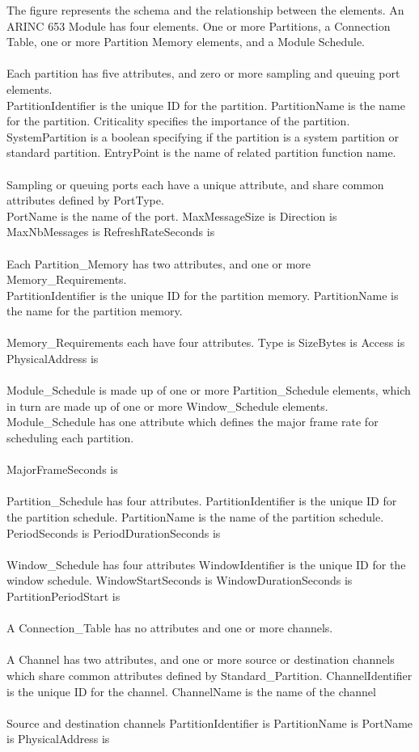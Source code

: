 The figure represents the schema and the 
relationship between the elements. 
An ARINC 653 Module has four elements.
One or more Partitions, a Connection Table, 
one or more Partition Memory elements, and 
a Module Schedule.
\\\\
Each partition has five attributes, and zero 
or more sampling and queuing port elements. 
\\
PartitionIdentifier is the unique ID for the partition. 
PartitionName is the name for the partition. 
Criticality specifies the importance of the partition.
SystemPartition is a boolean specifying if the partition 
is a system partition or standard partition. 
EntryPoint is the name of related partition function name.
\\\\
Sampling or queuing ports each have a unique 
attribute, and share common attributes defined 
by PortType.
\\
PortName is the name of the port. 
MaxMessageSize is
Direction is 
MaxNbMessages is
RefreshRateSeconds is
\\\\
Each Partition\_Memory has two attributes, 
and one or more Memory\_Requirements.
\\
PartitionIdentifier is the unique ID for the partition memory.
PartitionName is the name for the partition memory.
\\\\
Memory\_Requirements each have four attributes.
Type is
SizeBytes is 
Access is 
PhysicalAddress is
\\\\
Module\_Schedule is made up of one or more Partition\_Schedule elements, which in turn are made up of one or more Window\_Schedule elements. Module\_Schedule has one attribute which defines the major frame rate for scheduling each partition. 
\\\\
MajorFrameSeconds is
\\\\
Partition\_Schedule has four attributes.
PartitionIdentifier is the unique ID for the partition schedule.
PartitionName is the name of the partition schedule. 
PeriodSeconds is
PeriodDurationSeconds is
\\\\
Window\_Schedule has four attributes
WindowIdentifier is the unique ID for the window schedule. 
WindowStartSeconds is 
WindowDurationSeconds is 
PartitionPeriodStart is
\\\\
A Connection\_Table has no attributes and one or more channels.
\\\\
A Channel has two attributes, and one or more source or destination channels which share common attributes defined by Standard\_Partition.
ChannelIdentifier is the unique ID for the channel. 
ChannelName is the name of the channel
\\\\
Source and destination channels
PartitionIdentifier is 
PartitionName is 
PortName is 
PhysicalAddress is
\\\\
